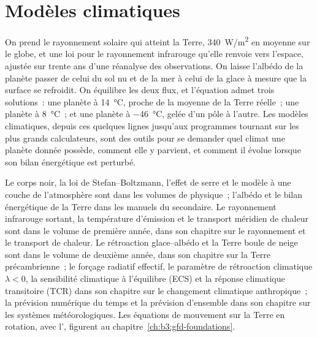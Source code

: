 \chapter{Modèles climatiques}\label{ch:b3:climate-models}

On prend le rayonnement solaire qui atteint la Terre, \qty{340}{W/m^2} en moyenne sur
le globe, et une loi pour le rayonnement infrarouge qu'elle renvoie vers l'espace, ajustée sur
trente ans d'une réanalyse des observations. On laisse l'albédo de la planète
passer de celui du sol nu et de la mer à celui de la glace à mesure que la surface se refroidit. On équilibre les deux
flux, et l'équation admet trois solutions~: une planète à
\qty{14}{\celsius}, proche de la moyenne de la Terre réelle~; une planète à
\qty{8}{\celsius}~; et une planète à \qty{-46}{\celsius}, gelée d'un pôle à
l'autre. Les modèles climatiques, depuis ces quelques lignes jusqu'aux programmes tournant sur les plus grands
calculateurs, sont des outils pour se demander quel climat une planète donnée possède, comment elle
y parvient, et comment il évolue lorsque son bilan énergétique est perturbé.

\begin{recall}
Le corps noir, la loi de Stefan--Boltzmann, l'effet de serre et le
modèle à une couche de l'atmosphère sont dans les volumes de physique~; l'albédo et
le bilan énergétique de la Terre dans les manuels du secondaire. Le rayonnement infrarouge
sortant, la température d'émission et le transport méridien de chaleur sont
dans le volume de première année, dans son chapitre sur le rayonnement et le transport de chaleur. Le
rétroaction glace--albédo et la Terre boule de neige sont dans le volume de deuxième année, dans
son chapitre sur la Terre précambrienne~; le forçage radiatif effectif, le
paramètre de rétroaction climatique $\lambda < 0$, la sensibilité climatique
à l'équilibre (ECS) et la réponse climatique transitoire (TCR) dans son chapitre
sur le changement climatique anthropique~; la prévision numérique du temps et la
prévision d'ensemble dans son chapitre sur les systèmes météorologiques. Les équations de
mouvement sur la Terre en rotation, avec l', figurent
au chapitre~\ref{ch:b3:gfd-foundations}.
\end{recall}

